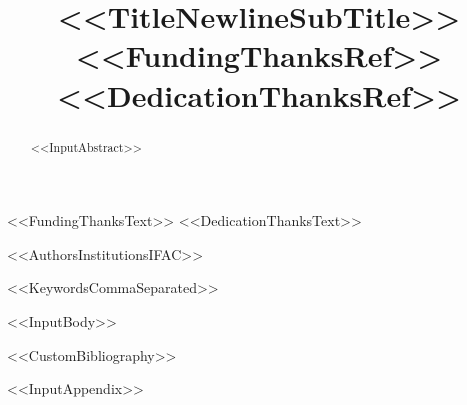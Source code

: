 \documentclass[<<DocumentClassOptions>>]{ifacconf}
\begin{document}
\begin{frontmatter}

\title{<<TitleNewlineSubTitle>><<FundingThanksRef>><<DedicationThanksRef>>}
<<FundingThanksText>>
<<DedicationThanksText>>

<<AuthorsInstitutionsIFAC>>

\begin{abstract} 
<<InputAbstract>>
\end{abstract}

\begin{keyword}
<<KeywordsCommaSeparated>>
\end{keyword}

\end{frontmatter}

<<InputBody>>

<<CustomBibliography>>

\appendix
<<InputAppendix>>
\end{document}
